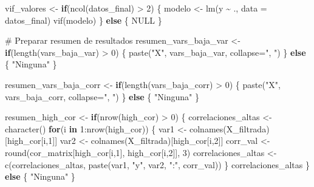 \documentclass[
  letterpaper,
  DIV=11,
  numbers=noendperiod]{scrreprt}
\newenvironment{Shaded}{\begin{snugshade}}{\end{snugshade}}
\newcommand{\AttributeTok}[1]{\textcolor[rgb]{0.40,0.45,0.13}{#1}}
\newcommand{\CommentTok}[1]{\textcolor[rgb]{0.37,0.37,0.37}{#1}}
\newcommand{\ConstantTok}[1]{\textcolor[rgb]{0.56,0.35,0.01}{#1}}
\newcommand{\ControlFlowTok}[1]{\textcolor[rgb]{0.00,0.23,0.31}{\textbf{#1}}}
\newcommand{\DecValTok}[1]{\textcolor[rgb]{0.68,0.00,0.00}{#1}}
\newcommand{\FunctionTok}[1]{\textcolor[rgb]{0.28,0.35,0.67}{#1}}
\newcommand{\NormalTok}[1]{\textcolor[rgb]{0.00,0.23,0.31}{#1}}
\newcommand{\OtherTok}[1]{\textcolor[rgb]{0.00,0.23,0.31}{#1}}
\newcommand{\SpecialCharTok}[1]{\textcolor[rgb]{0.37,0.37,0.37}{#1}}
\newcommand{\StringTok}[1]{\textcolor[rgb]{0.13,0.47,0.30}{#1}}
\begin{document}
\begin{tcolorbox}
\begin{Shaded}
\begin{Highlighting}[]
\NormalTok{vif\_valores }\OtherTok{\textless{}{-}} \ControlFlowTok{if}\NormalTok{(}\FunctionTok{ncol}\NormalTok{(datos\_final) }\SpecialCharTok{\textgreater{}} \DecValTok{2}\NormalTok{) \{}
\NormalTok{  modelo }\OtherTok{\textless{}{-}} \FunctionTok{lm}\NormalTok{(y }\SpecialCharTok{\textasciitilde{}}\NormalTok{ ., }\AttributeTok{data =}\NormalTok{ datos\_final)}
  \FunctionTok{vif}\NormalTok{(modelo)}
\NormalTok{\} }\ControlFlowTok{else}\NormalTok{ \{}
  \ConstantTok{NULL}
\NormalTok{\}}

\CommentTok{\# Preparar resumen de resultados}
\NormalTok{resumen\_vars\_baja\_var }\OtherTok{\textless{}{-}} \ControlFlowTok{if}\NormalTok{(}\FunctionTok{length}\NormalTok{(vars\_baja\_var) }\SpecialCharTok{\textgreater{}} \DecValTok{0}\NormalTok{) \{}
  \FunctionTok{paste}\NormalTok{(}\StringTok{"X"}\NormalTok{, vars\_baja\_var, }\AttributeTok{collapse=}\StringTok{", "}\NormalTok{)}
\NormalTok{\} }\ControlFlowTok{else}\NormalTok{ \{}
  \StringTok{"Ninguna"}
\NormalTok{\}}

\NormalTok{resumen\_vars\_baja\_corr }\OtherTok{\textless{}{-}} \ControlFlowTok{if}\NormalTok{(}\FunctionTok{length}\NormalTok{(vars\_baja\_corr) }\SpecialCharTok{\textgreater{}} \DecValTok{0}\NormalTok{) \{}
  \FunctionTok{paste}\NormalTok{(}\StringTok{"X"}\NormalTok{, vars\_baja\_corr, }\AttributeTok{collapse=}\StringTok{", "}\NormalTok{)}
\NormalTok{\} }\ControlFlowTok{else}\NormalTok{ \{}
  \StringTok{"Ninguna"}
\NormalTok{\}}

\NormalTok{resumen\_high\_cor }\OtherTok{\textless{}{-}} \ControlFlowTok{if}\NormalTok{(}\FunctionTok{nrow}\NormalTok{(high\_cor) }\SpecialCharTok{\textgreater{}} \DecValTok{0}\NormalTok{) \{}
\NormalTok{  correlaciones\_altas }\OtherTok{\textless{}{-}} \FunctionTok{character}\NormalTok{()}
  \ControlFlowTok{for}\NormalTok{(i }\ControlFlowTok{in} \DecValTok{1}\SpecialCharTok{:}\FunctionTok{nrow}\NormalTok{(high\_cor)) \{}
\NormalTok{    var1 }\OtherTok{\textless{}{-}} \FunctionTok{colnames}\NormalTok{(X\_filtrada)[high\_cor[i,}\DecValTok{1}\NormalTok{]]}
\NormalTok{    var2 }\OtherTok{\textless{}{-}} \FunctionTok{colnames}\NormalTok{(X\_filtrada)[high\_cor[i,}\DecValTok{2}\NormalTok{]]}
\NormalTok{    corr\_val }\OtherTok{\textless{}{-}} \FunctionTok{round}\NormalTok{(cor\_matrix[high\_cor[i,}\DecValTok{1}\NormalTok{], high\_cor[i,}\DecValTok{2}\NormalTok{]], }\DecValTok{3}\NormalTok{)}
\NormalTok{    correlaciones\_altas }\OtherTok{\textless{}{-}} \FunctionTok{c}\NormalTok{(correlaciones\_altas, }\FunctionTok{paste}\NormalTok{(var1, }\StringTok{"y"}\NormalTok{, var2, }\StringTok{":"}\NormalTok{, corr\_val))}
\NormalTok{  \}}
\NormalTok{  correlaciones\_altas}
\NormalTok{\} }\ControlFlowTok{else}\NormalTok{ \{}
  \StringTok{"Ninguna"}
\NormalTok{\}}


\end{Highlighting}
\end{Shaded}
\end{tcolorbox}
\end{document}
